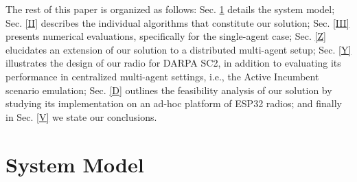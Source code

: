 \documentclass[12pt, draftcls, onecolumn]{IEEEtran}
\begin{document}
The rest of this paper is organized as follows: Sec. \ref{I} details the system model; Sec. \ref{II} describes the individual algorithms that constitute our solution; Sec. \ref{III} presents numerical evaluations, specifically for the single-agent case; Sec. \ref{Z} elucidates an extension of our solution to a distributed multi-agent setup; Sec. \ref{Y} illustrates the design of our radio for DARPA SC2, in addition to evaluating its performance in centralized multi-agent settings, i.e., the Active Incumbent scenario emulation; Sec. \ref{D} outlines the feasibility analysis of our solution by studying its implementation on an ad-hoc platform of ESP32 radios; and finally in Sec. \ref{V} we state our conclusions.

\section{System Model}\label{I}
\end{document}
